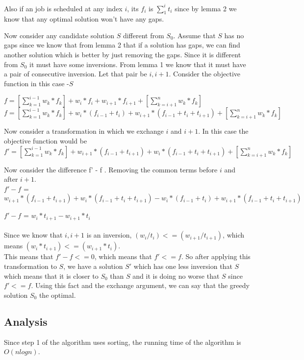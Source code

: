 \documentclass[12pt]{article}
\begin{document}
Also if an job is scheduled at any index $i$, its $f_i$ is $\sum\limits_{1}^{i} t_i$ since by lemma 2 we know that any optimal solution won't have any gaps.



Now consider any candidate solution $S$ different from $S_0$. Assume that $S$ has no gaps since we know that from lemma 2 that if a solution has gaps, we can find another solution which is better by just removing the gaps. Since it is different from $S_0$ it must have some inversions. From lemma 1 we know that it must have a pair of consecutive inversion. Let that pair be $i,i+1$. Consider the objective function in this case -$S$

$ f = [\sum\limits_{k=1}^{i-1} w_k* f_k]  + w_i*f_i + w_{i+1}*f_{i+1} + [\sum\limits_{k=i+1}^{n} w_k* f_k]$\\
$ f = [\sum\limits_{k=1}^{i-1} w_k* f_k]  + w_i*(f_{i-1} + t_i) + w_{i+1}*(f_{i-1} + t_i + t_{i+1}) + [\sum\limits_{k=i+1}^{n} w_k* f_k]$

Now consider a transformation in which we exchange $i$ and $i+1$. In this case the objective function would be\\
$ f' = [\sum\limits_{k=1}^{i-1} w_k* f_k]  + w_{i+1}*(f_{i-1} + t_{i+1}) + w_{i}*(f_{i-1} + t_i + t_{i+1}) + [\sum\limits_{k=i+1}^{n} w_k* f_k]$

Now consider the difference f' - f . Removing the common terms before $i$ and after $i+1$.\\

$f'-f$ = $w_{i+1}*(f_{i-1} + t_{i+1}) + w_{i}*(f_{i-1} + t_i + t_{i+1}) - w_i*(f_{i-1} + t_i) + w_{i+1}*(f_{i-1} + t_i + t_{i+1})$

$f'-f$ = $w_i * t_{i+1}  - w_{i+1} * t_i$\\\\
Since we know that $i,i+1$ is an inversion, $(w_i / t_i) <= (w_{i+1}/ t_{i+1})$, which means $(w_i * t_{i+1}) <= (w_{i+1} * t_{i})$.\\
This means that $f'-f <= 0 $, which means that $f' <= f$.
So after applying this transformation to $S$, we have a solution $S'$ which has one less inversion that $S$ which means that it is closer to $S_0$ than $S$ and it is doing no worse that $S$ since $f' <= f$. Using this fact and the exchange argument, we can say that the greedy solution $S_0$ the optimal.
\subsection{Analysis}
Since step 1 of the algorithm uses sorting, the running time of the algorithm is $O(n logn)$.
\end{document}
